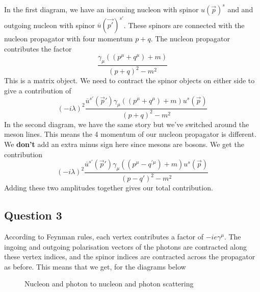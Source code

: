 In the first diagram, we have an 
incoming nucleon with spinor $ u\left( \vec{p}  \right)  ^ s $ and 
and outgoing nucleon with spinor $ \overline{ u } \left( \vec{p '} \right) ^{ s ' } $. 
These spinors are connected with the nucleon propagator
with four momentum $  p + q$. 
The nucleon propagator contributes the factor 
\[
 \frac{ \gamma _ \mu \left(  (p ^ \mu +q ^ \mu) + m   \right)  }{ 
 \left(  p  + q  \right)  ^ 2  - m ^ 2  }
\] This is a matrix object. 
We need to contract the spinor objects on either side to 
give a contribution of 
\[
\left(   - i \lambda  \right)  ^ 2 \frac{
\overline{ u } ^{ s  ' } \left( \vec{p} '   \right) \gamma _ \mu 
\left(  (p ^ \mu + q ^ \mu) + m   \right)  u ^ s \left( \vec{p}  \right)  }{ 
\left(  p + q  \right)  ^ 2 - m ^ 2 }
\]
In the second diagram, we have the same 
story but we've switched around the 
meson lines. This means the 
4 momentum of our nucleon propagator is different. 
We \textbf{don't } add an extra minus sign here 
since mesons are bosons. We get the contribution 
\[
\left(   - i \lambda  \right)  ^ 2 \frac{
\overline{ u } ^{ s  ' } \left( \vec{p} '   \right) \gamma _ \mu 
\left(  ( p ^ \mu  - q ^{  ' \mu }) + m   \right)  u ^ s \left( \vec{p}  \right)  }{ 
\left(  p  - q'   \right)  ^ 2 - m ^ 2 }
\]
Adding these two amplitudes 
together gives our total 
contribution. 

\subsection*{Question 3}
According to Feynman rules, 
each vertex contributes a factor of $  - i e \gamma ^ \mu $. 
The ingoing and outgoing polarisation vectors of 
the photons are contracted along these 
vertex indices, and the 
spinor indices are contracted across the propagator as before. 
This means that we get, 
for the diagrams below

\begin{figure}[htpb]
\centering

\caption{Nucleon and photon 
to nucleon and photon scattering}%
\label{fig:e4_q1}
\end{figure}

